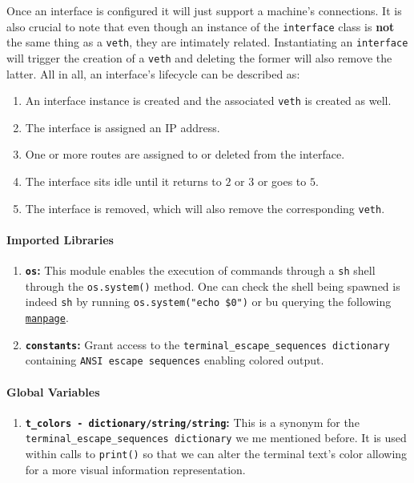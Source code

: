                 Once an interface is configured it will just support a machine's connections. It is also crucial to note that even though an instance of the \texttt{interface} class is \textbf{not} the same thing as a \texttt{veth}, they are intimately related. Instantiating an \texttt{interface} will trigger the creation of a \texttt{veth} and deleting the former will also remove the latter. All in all, an interface's lifecycle can be described as:

                \begin{enumerate}
                    \item An interface instance is created and the associated \texttt{veth} is created as well.
                    \item The interface is assigned an IP address.
                    \item One or more routes are assigned to or deleted from the interface.
                    \item The interface sits idle until it returns to $2$ or $3$ or goes to $5$.
                    \item The interface is removed, which will also remove the corresponding \texttt{veth}.
                \end{enumerate}

                \paragraph{Imported Libraries}
                    \begin{enumerate}
                        \item \textbf{\texttt{os}:} This module enables the execution of commands through a \texttt{sh} shell through the \texttt{os.system()} method. One can check the shell being spawned is indeed \texttt{sh} by running \texttt{\allowbreak os.system("echo \$0")} or bu querying the following \href{https://linux.die.net/man/3/system}{\texttt{manpage}}.
                        \item \textbf{\texttt{constants}:} Grant access to the \texttt{\allowbreak terminal\_escape\_sequences dictionary} containing \texttt{ANSI escape sequences} enabling colored output.
                    \end{enumerate}

                \paragraph{Global Variables}
                    \begin{enumerate}
                        \item \textbf{\texttt{\allowbreak t\_colors - dictionary/string/string}:} This is a synonym for the \texttt{\allowbreak terminal\_escape\_sequences dictionary} we me mentioned before. It is used within calls to \texttt{print()} so that we can alter the terminal text's color allowing for a more visual information representation.
                    \end{enumerate}

